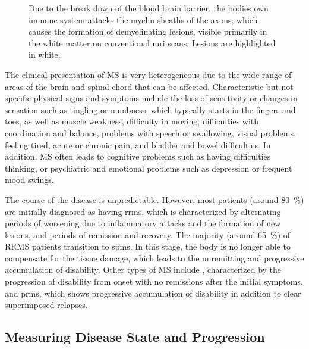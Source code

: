 \begin{figure}[tb]

\caption[Demyelination in MS]{Due to the break down of the blood brain barrier,
the bodies own immune system attacks the myelin sheaths of the axons, which
causes the formation of demyelinating lesions, visible primarily in the white
matter on conventional \gls{mri} scans. Lesions are highlighted in white.}
\label{fig:ms}
\end{figure}
 
The clinical presentation of MS is very heterogeneous due to the wide range of
areas of the brain and spinal chord that can be affected. Characteristic but not
specific physical signs and symptoms include the loss of sensitivity or changes
in sensation such as tingling or numbness, which typically starts in the fingers
and toes, as well as muscle weakness, difficulty in moving, difficulties with
coordination and balance, problems with speech or swallowing, visual problems,
feeling tired, acute or chronic pain, and bladder and bowel difficulties. In
addition, MS often leads to cognitive problems such as having difficulties
thinking, or psychiatric and emotional problems such as depression or frequent
mood swings.

The course of the disease is unpredictable. However, most patients (around
\SI{80}{\percent}) are initially diagnosed as having \gls{rrms}, which is
characterized by alternating periods of worsening due to inflammatory attacks
and the formation of new lesions, and periods of remission and recovery. The
majority (around \SI{65}{\percent}) of RRMS patients transition to \gls{spms}.
In this stage, the body is no longer able to compensate for the tissue damage,
which leads to the unremitting and progressive accumulation of disability. Other
types of MS include ,
characterized by the progression of disability from onset with no remissions
after the initial symptoms, and \gls{prms}, which shows progressive accumulation
of disability in addition to clear superimposed relapses.


\subsection[Measuring disease state and progression]{Measuring Disease State and
Progression}


